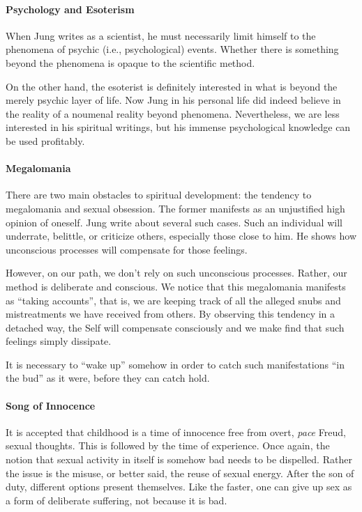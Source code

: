 \paragraph{Psychology and Esoterism}
When Jung writes as a scientist, he must necessarily limit himself to the phenomena of psychic (i.e., psychological) events. Whether there is something beyond the phenomena is opaque to the scientific method.

On the other hand, the esoterist is definitely interested in what is beyond the merely psychic layer of life. Now Jung in his personal life did indeed believe in the reality of a noumenal reality beyond phenomena. Nevertheless, we are less interested in his spiritual writings, but his immense psychological knowledge can be used profitably.

\paragraph{Megalomania}
There are two main obstacles to spiritual development: the tendency to megalomania and sexual obsession. The former manifests as an unjustified high opinion of oneself. Jung write about several such cases. Such an individual will underrate, belittle, or criticize others, especially those close to him. He shows how unconscious processes will compensate for those feelings.

However, on our path, we don't rely on such unconscious processes. Rather, our method is deliberate and conscious. We notice that this megalomania manifests as “taking accounts”, that is, we are keeping track of all the alleged snubs and mistreatments we have received from others. By observing this tendency in a detached way, the Self will compensate consciously and we make find that such feelings simply dissipate.

It is necessary to “wake up” somehow in order to catch such manifestations “in the bud” as it were, before they can catch hold.

\paragraph{Song of Innocence}
It is accepted that childhood is a time of innocence free from overt, \emph{pace} Freud, sexual thoughts. This is followed by the time of experience. Once again, the notion that sexual activity in itself is somehow bad needs to be dispelled. Rather the issue is the misuse, or better said, the reuse of sexual energy. After the son of duty, different options present themselves. Like the faster, one can give up sex as a form of deliberate suffering, not because it is bad.

